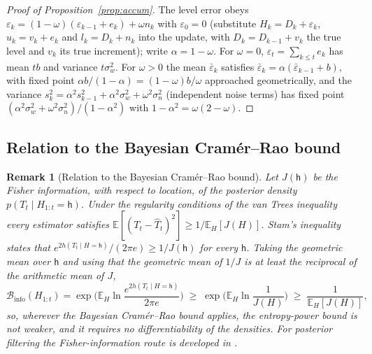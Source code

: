 \documentclass[preprint,12pt]{elsarticle}
\newtheorem{remark}{Remark}
\theoremstyle{definition}
\newcommand{\E}{\mathbb{E}}
\newcommand{\Binfo}{\mathcal{B}_{\mathrm{info}}}
\begin{document}
\begin{proof}[Proof of Proposition~\ref{prop:accum}]
The level error obeys $\varepsilon_k=(1-\omega)(\varepsilon_{k-1}+e_k)+\omega n_k$ with $\varepsilon_0=0$ (substitute $H_k=D_k+\varepsilon_k$, $u_k=v_k+e_k$ and $l_k=D_k+n_k$ into the update, with $D_k=D_{k-1}+v_k$ the true level and $v_k$ its true increment); write $\alpha=1-\omega$. For $\omega=0$, $\varepsilon_t=\sum_{k\le t}e_k$ has mean $tb$ and variance $t\sigma_w^2$. For $\omega>0$ the mean $\bar\varepsilon_k$ satisfies $\bar\varepsilon_k=\alpha(\bar\varepsilon_{k-1}+b)$, with fixed point $\alpha b/(1-\alpha)=(1-\omega)b/\omega$ approached geometrically, and the variance $s_k^2=\alpha^2s_{k-1}^2+\alpha^2\sigma_w^2+\omega^2\sigma_n^2$ (independent noise terms) has fixed point $(\alpha^2\sigma_w^2+\omega^2\sigma_n^2)/(1-\alpha^2)$ with $1-\alpha^2=\omega(2-\omega)$.
\end{proof}


\subsection{Relation to the Bayesian Cram\'er--Rao bound}
\begin{remark}[Relation to the Bayesian Cram\'er--Rao bound]
\label{rem:bcrb}
Let $J(\mathsf h)$ be the Fisher information, with respect to location, of the posterior density $p(T_t\mid H_{1:t}=\mathsf h)$. Under the regularity conditions of the van Trees inequality \cite{vantrees1968,gill1995} every estimator satisfies $\E[(T_t-\hat T_t)^2]\ge 1/\E_H[J(H)]$. Stam's inequality \cite{stam1959} states that $e^{2h(T_t\mid H=\mathsf h)}/(2\pi e)\ge 1/J(\mathsf h)$ for every $\mathsf h$. Taking the geometric mean over $\mathsf h$ and using that the geometric mean of $1/J$ is at least the reciprocal of the arithmetic mean of $J$,
\begin{equation}
\Binfo(H_{1:t})=\exp\!\Big(\E_H\ln\frac{e^{2h(T_t\mid H=\mathsf h)}}{2\pi e}\Big)\;\ge\;\exp\!\Big(\E_H\ln\frac1{J(H)}\Big)\;\ge\;\frac{1}{\E_H[J(H)]},
\end{equation}
so, wherever the Bayesian Cram\'er--Rao bound applies, the entropy-power bound is not weaker, and it requires no differentiability of the densities. For posterior filtering the Fisher-information route is developed in \cite{tichavsky1998}.
\end{remark}
\end{document}

